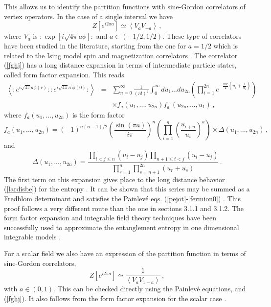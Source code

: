 \documentclass[11pt]{article}
\begin{document}
This allows us to identify the partition functions with sine-Gordon correlators of vertex operators. In the case of a single interval we have  
\begin{equation}
Z[e^{i 2 \pi a}] \simeq \left< V_{a}V_{-a} \right>\,,\label{fghj}
\end{equation}
where $V_{a}$ is $:\exp[i\sqrt{4\pi}a \phi]:$ and  $a\in (-1/2,1/2)$. These type of correlators have been studied in the literature, starting from the one for $a=1/2$ which is related to the Ising model spin and magnetization correlators \cite{ising}. The correlator (\ref{fghj}) has a long distance expansion in terms of intermediate particle states, called form factor expansion. This reads
\begin{eqnarray}
\left\langle :e^{i\sqrt{4\pi } a \phi (r)}::e^{i\sqrt{4\pi } a
^{\prime }\phi (0)}:\right\rangle &=&\sum_{n=0}^{\infty }\frac{1}{\left(
n!\right) ^{2}}\int_{0}^{\infty }du_{1}...du_{2n}\left( \prod_{i=1}^{2n}e^{-
\frac{mr}{2}\left( u_{i}+\frac{1}{u_{i}}\right) }\right) \nonumber \\
&&\times f_{a }(u_{1},...,u_{2n})f_{a ^{\prime
}}(u_{2n},...,u_{1})\,,  \label{hache1}
\end{eqnarray}
where $f_{a }(u_{1},...,u_{2n})$ is the form factor
\begin{equation}
f_{a }(u_{1},...,u_{2n})=(-1)^{n(n-1)/2}\left( \frac{\sin \left( \pi
a \right) }{i\pi }\right) ^{n}\left( \prod_{i=1}^{n}\left( \frac{u_{i+n}
}{u_{i}}\right) ^{a }\right) \times \Delta (u_{1},...,u_{2n})\,,
\end{equation}
and
\begin{equation}
\Delta (u_{1},...,u_{2n})=\frac{\prod_{i<j\leq n}\left( u_{i}-u_{j}\right)
\prod_{n+1\leq i<j}\left( u_{i}-u_{j}\right) }{\prod_{r=1}^{n}
\prod_{s=n+1}^{2n}\left( u_{r}+u_{s}\right) }\,.
\end{equation}
The first term on this expansion gives place to the long distance behavior (\ref{lardisbe}) for the entropy \cite{fermion,ccd}. It can be shown that this series may be summed as a Fredhlom determinant and satisfies the Painlev\'e eqs. (\ref{pejot}-\ref{fermion0}) \cite{suma}.  This proof follows a very different route than the one in sections 3.1.1 and 3.1.2. 
The form factor expansion and integrable field theory techniques have been successfully used to approximate the entanglement entropy in one dimensional integrable models \cite{ccd,d1,dc}.    


For a scalar field we also have an expression of the partition function in terms of sine-Gordon correlators,
\begin{equation}
Z[e^{i 2 \pi a}] \simeq \frac{1}{\left< V_{a}V_{1-a} \right>}\,,
\end{equation}
with $a\in(0,1)$. This can be checked directly using the Painlev\'e equations, and (\ref{fghj}). It also follows from the form factor expansion for the scalar case \cite{mussardo}.
\end{document}
